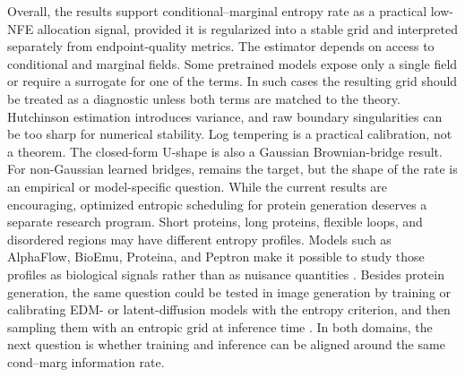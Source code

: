 \documentclass{article}
\theoremstyle{plain}
\theoremstyle{definition}
\theoremstyle{remark}
\begin{document}
Overall, the results support conditional--marginal entropy rate as a practical low-NFE allocation signal, provided it is regularized into a stable grid and interpreted separately from endpoint-quality metrics. The estimator depends on access to conditional and marginal fields. Some pretrained models expose only a single field or require a surrogate for one of the terms. In such cases the resulting grid should be treated as a diagnostic unless both terms are matched to the theory. Hutchinson estimation introduces variance, and raw boundary singularities can be too sharp for numerical stability. Log tempering is a practical calibration, not a theorem. The closed-form U-shape is also a Gaussian Brownian-bridge result. For non-Gaussian learned bridges,  remains the target, but the shape of the rate is an empirical or model-specific question. While the current results are encouraging, optimized entropic scheduling for protein generation deserves a separate research program. Short proteins, long proteins, flexible loops, and disordered regions may have different entropy profiles. Models such as AlphaFlow, BioEmu, Proteina, and Peptron make it possible to study those profiles as biological signals rather than as nuisance quantities \citep{jing2024alphafoldmeetsflowmatching,bioemu2024,proteina2025, peptron2025}. Besides protein generation, the same question could be tested in image generation by training or calibrating EDM- or latent-diffusion models with the entropy criterion, and then sampling them with an entropic grid at inference time \citep{karras2022edm,rombach2022ldm,ho2020ddpm}. In both domains, the next question is whether training and inference can be aligned around the same cond--marg information rate.


\end{document}
